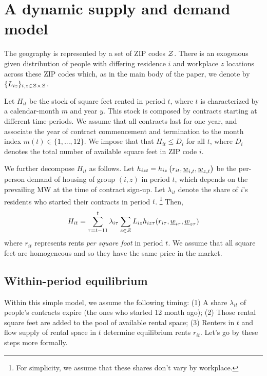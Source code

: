 
\clearpage
\section{A dynamic supply and demand model}\label{sec:dyn_theory_model}

The geography is represented by a set of ZIP codes $\mathcal{Z}$.
There is an exogenous given distribution of people with differing residence $i$ and 
workplace $z$ locations across these ZIP codes which,
as in the main body of the paper, we denote by $\{L_{iz}\}_{i,z\in\mathcal{Z}\times\mathcal{Z}}$.

Let $H_{it}$ be the stock of square feet rented in period $t$, where $t$ is characterized 
by a calendar-month $m$ and year $y$.
This stock is composed by contracts starting at different time-periods. 
We assume that all contracts last for one year, and associate the year of contract
commencement and termination to the month index $m(t)\in\{1,...,12\}$.
We impose that that $H_{it} \leq D_i$ for all $t$, where $D_i$ denotes the total number 
of available square feet in ZIP code $i$.

We further decompose $H_{it}$ as follows. 
Let $h_{izt} = h_{iz}\left(r_{it}, \underline{w}_{i,t}, \underline{w}_{z,t}\right)$ be the 
per-person demand of housing of group $(i,z)$ in period $t$,
which depends on the prevailing MW at the time of contract sign-up.
Let $\lambda_{it}$ denote the share of $i$'s residents who started their contracts in 
period $t$.%
\footnote{For simplicity, we assume that these shares don't vary by workplace.}
Then,
$$
H_{it} = \sum_{\tau = t - 11}^t \lambda_{i\tau} \sum_{z\in\mathcal{Z}} L_{iz} 
h_{iz\tau} (r_{i\tau}, \underline{w}_{i\tau}, \underline{w}_{z\tau})
$$
where 
$r_{it}$ represents rents \textit{per square foot} in period $t$. 
We assume that all square feet are homogeneous and so they have the same price in the 
market.

\subsection*{Within-period equilibrium}

Within this simple model, we assume the following timing: 
(1) A share $\lambda_{it}$ of people's contracts expire (the ones who started 12 month 
ago);
(2) Those rental square feet are added to the pool of available rental space;
(3) Renters in $t$ and flow supply of rental space in $t$ determine equilibrium rents 
$r_{it}$.
Let's go by these steps more formally.

